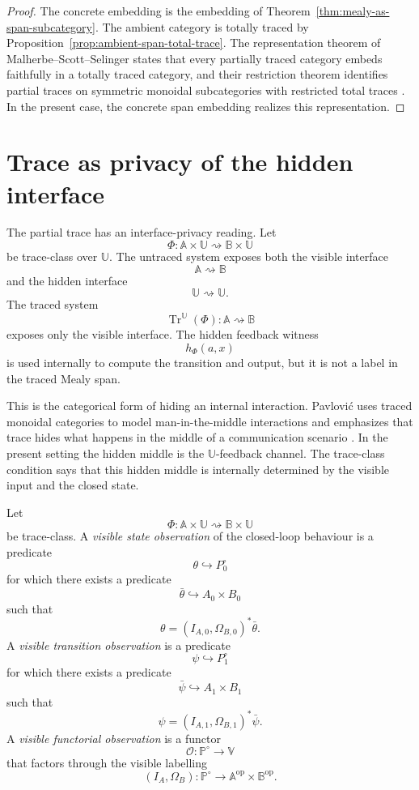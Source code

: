 \begin{proof}
The concrete embedding is the embedding of
Theorem~\ref{thm:mealy-as-span-subcategory}.  The ambient category is totally
traced by Proposition~\ref{prop:ambient-span-total-trace}.  The representation
theorem of Malherbe--Scott--Selinger states that every partially traced
category embeds faithfully in a totally traced category, and their restriction
theorem identifies partial traces on symmetric monoidal subcategories with
restricted total traces
\cite{MalherbeScottSelingerPartiallyTracedCategories}.  In the present case,
the concrete span embedding realizes this representation.
\end{proof}

\section{Trace as privacy of the hidden interface}
\label{sec:trace-as-privacy-hidden-interface}

The partial trace has an interface-privacy reading.  Let
\[
\Phi:
\mathbb A\times\mathbb U
\rightsquigarrow
\mathbb B\times\mathbb U
\]
be trace-class over \(\mathbb U\).  The untraced system exposes both the
visible interface
\[
\mathbb A\rightsquigarrow\mathbb B
\]
and the hidden interface
\[
\mathbb U\rightsquigarrow\mathbb U.
\]
The traced system
\[
\operatorname{Tr}^{\mathbb U}(\Phi):
\mathbb A\rightsquigarrow\mathbb B
\]
exposes only the visible interface.  The hidden feedback witness
\[
h_\Phi(a,x)
\]
is used internally to compute the transition and output, but it is not a
label in the traced Mealy span.

This is the categorical form of hiding an internal interaction.  Pavlovi\'c
uses traced monoidal categories to model man-in-the-middle interactions and
emphasizes that trace hides what happens in the middle of a communication
scenario
\cite{PavlovicTracingManInTheMiddle}.  In the present setting the hidden
middle is the \(\mathbb U\)-feedback channel.  The trace-class condition says
that this hidden middle is internally determined by the visible input and the
closed state.

\begin{definition}
\label{def:visible-observation}
Let
\[
\Phi:
\mathbb A\times\mathbb U
\rightsquigarrow
\mathbb B\times\mathbb U
\]
be trace-class.  A \emph{visible state observation} of the closed-loop
behaviour is a predicate
\[
\theta\hookrightarrow P^\circ_0
\]
for which there exists a predicate
\[
\bar\theta\hookrightarrow A_0\times B_0
\]
such that
\[
\theta=(I_{A,0},\Omega_{B,0})^*\bar\theta.
\]
A \emph{visible transition observation} is a predicate
\[
\psi\hookrightarrow P^\circ_1
\]
for which there exists a predicate
\[
\bar\psi\hookrightarrow A_1\times B_1
\]
such that
\[
\psi=(I_{A,1},\Omega_{B,1})^*\bar\psi.
\]
A \emph{visible functorial observation} is a functor
\[
\mathcal O:\mathbb P^\circ\to\mathbb V
\]
that factors through the visible labelling
\[
(I_A,\Omega_B):
\mathbb P^\circ\to
\mathbb A^{\mathrm{op}}\times\mathbb B^{\mathrm{op}}.
\]
\end{definition}

